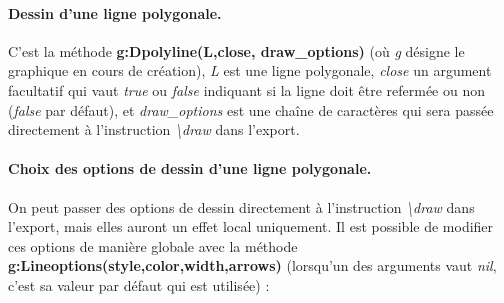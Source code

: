 \paragraph{Dessin d'une ligne polygonale.}

C'est la méthode \textbf{g:Dpolyline(L,close, draw\_options)} (où \emph{g} désigne le graphique en cours de création), \emph{L} est une ligne polygonale, \emph{close} un argument facultatif qui vaut \emph{true} ou \emph{false} indiquant si la ligne doit être refermée ou non (\emph{false} par défaut), et \emph{draw\_options} est une chaîne de caractères qui sera passée directement à l'instruction \emph{\textbackslash draw} dans l'export.

\paragraph{Choix des options de dessin d'une ligne polygonale.}

On peut passer des options de dessin directement à l'instruction \emph{\textbackslash draw} dans l'export, mais elles auront un effet local uniquement. Il est possible de modifier ces options de manière globale avec la méthode \textbf{g:Lineoptions(style,color,width,arrows)} (lorsqu'un des arguments vaut \emph{nil}, c'est sa valeur par défaut qui est utilisée) :

